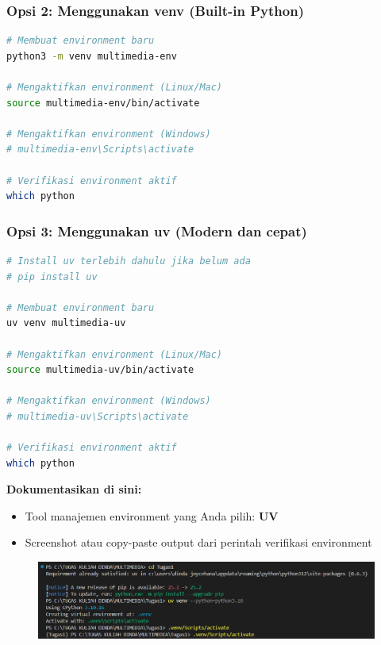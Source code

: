 \documentclass[11pt,a4paper]{article}
\begin{document}
\subsubsection{Opsi 2: Menggunakan venv (Built-in Python)}
\begin{lstlisting}[language=bash, caption=Membuat environment dengan venv]
# Membuat environment baru
python3 -m venv multimedia-env

# Mengaktifkan environment (Linux/Mac)
source multimedia-env/bin/activate

# Mengaktifkan environment (Windows)
# multimedia-env\Scripts\activate

# Verifikasi environment aktif
which python
\end{lstlisting}

\subsubsection{Opsi 3: Menggunakan uv (Modern dan cepat)}
\begin{lstlisting}[language=bash, caption=Membuat environment dengan uv]
# Install uv terlebih dahulu jika belum ada
# pip install uv

# Membuat environment baru
uv venv multimedia-uv

# Mengaktifkan environment (Linux/Mac)
source multimedia-uv/bin/activate

# Mengaktifkan environment (Windows)
# multimedia-uv\Scripts\activate

# Verifikasi environment aktif
which python
\end{lstlisting}

\textbf{Dokumentasikan di sini:}
\begin{itemize}
    \item Tool manajemen environment yang Anda pilih: \textbf{UV}
    \item Screenshot atau copy-paste output dari perintah verifikasi environment
\end{itemize}
\begin{figure}
\includegraphics[width=1\textwidth]{Figure/verifikasi_env.png}
\end{figure}
\end{document}
